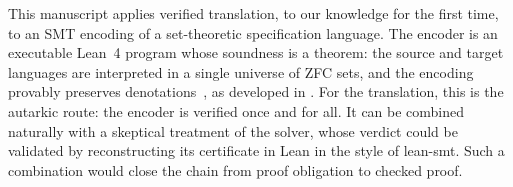 This manuscript applies verified translation, to our knowledge for the first
time, to an SMT encoding of a set-theoretic specification language. The encoder
\beer{} is an executable Lean~4 program whose soundness is a theorem: the source
and target languages are interpreted in a single universe of ZFC sets, and the
encoding provably preserves denotations~\cite{trelat2025beer}, as developed in
. For the translation, this is
the autarkic route: the encoder is verified once and for all. It can be combined
naturally with a skeptical treatment of the solver, whose verdict could be
validated by reconstructing its certificate in Lean in the style of lean-smt.
Such a combination would close the chain from proof obligation to checked
proof.
